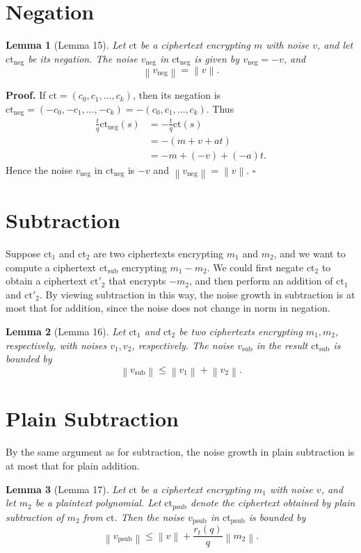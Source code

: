 \documentclass[11pt]{article}
\newtheorem{lemma}{Lemma}
\newcommand{\norm}[1]{\left\lVert #1\right\rVert}
\newcommand{\ct}{\mathrm{ct}}
\newcommand{\ctneg}{\mathrm{ct}_{\mathrm{neg}}}
\newcommand{\ctsub}{\mathrm{ct}_{\mathrm{sub}}}
\newcommand{\ctpsub}{\mathrm{ct}_{\mathrm{psub}}}
\newcommand{\vneg}{v_{\mathrm{neg}}}
\newcommand{\vsub}{v_{\mathrm{sub}}}
\newcommand{\vpsub}{v_{\mathrm{psub}}}
\begin{document}
\section*{Negation}

\begin{lemma}[Lemma 15]
Let $\ct$ be a ciphertext encrypting $m$ with noise $v$, and let
$\ctneg$ be its negation. The noise $\vneg$ in $\ctneg$ is given by
$\vneg=-v$, and
\[
  \norm{\vneg}=\norm{v}.
\]
\end{lemma}

\textbf{Proof.}
If $\ct=(c_0,c_1,\ldots,c_k)$, then its negation is
$\ctneg=(-c_0,-c_1,\ldots,-c_k)=-(c_0,c_1,\ldots,c_k)$.
Thus
\begin{align*}
\frac{t}{q}\ctneg(s)
&=-\frac{t}{q}\ct(s)\\
&=-(m+v+at)\\
&=-m+(-v)+(-a)t.
\end{align*}
Hence the noise $\vneg$ in $\ctneg$ is $-v$ and
$\norm{\vneg}=\norm{v}$.
\hfill$\square$

\section*{Subtraction}

Suppose $\ct_1$ and $\ct_2$ are two ciphertexts encrypting $m_1$ and
$m_2$, and we want to compute a ciphertext $\ctsub$ encrypting
$m_1-m_2$. We could first negate $\ct_2$ to obtain a ciphertext
$\ct'_2$ that encrypts $-m_2$, and then perform an addition of
$\ct_1$ and $\ct'_2$. By viewing subtraction in this way, the noise
growth in subtraction is at most that for addition, since the noise
does not change in norm in negation.

\begin{lemma}[Lemma 16]
Let $\ct_1$ and $\ct_2$ be two ciphertexts encrypting $m_1,m_2$,
respectively, with noises $v_1,v_2$, respectively. The noise
$\vsub$ in the result $\ctsub$ is bounded by
\[
  \norm{\vsub}\leq \norm{v_1}+\norm{v_2}.
\]
\end{lemma}

\section*{Plain Subtraction}

By the same argument as for subtraction, the noise growth in plain
subtraction is at most that for plain addition.

\begin{lemma}[Lemma 17]
Let $\ct$ be a ciphertext encrypting $m_1$ with noise $v$, and let
$m_2$ be a plaintext polynomial. Let $\ctpsub$ denote the ciphertext
obtained by plain subtraction of $m_2$ from $\ct$. Then the noise
$\vpsub$ in $\ctpsub$ is bounded by
\[
  \norm{\vpsub}\leq \norm{v}+\frac{r_t(q)}{q}\norm{m_2}.
\]
\end{lemma}
\end{document}
